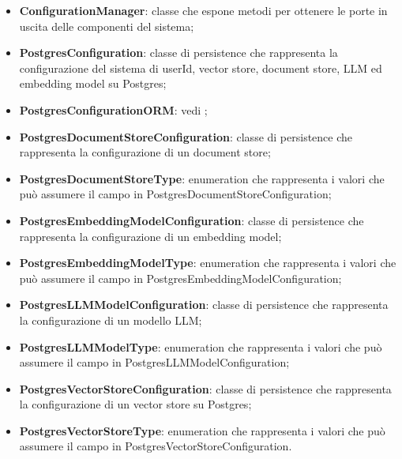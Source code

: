 \documentclass[10pt, a4paper]{article}
\begin{document}
\begin{itemize}
    \item \label{ConfigurationManager}\textbf{ConfigurationManager}: classe che espone metodi per ottenere le porte in uscita delle componenti del sistema;
    \item \label{PostgresConfiguration}\textbf{PostgresConfiguration}: classe di persistence che rappresenta la configurazione del sistema di userId, vector store, document store, LLM ed embedding model su Postgres;
    \item \textbf{PostgresConfigurationORM}: vedi ;
    \item \label{PostgresDocumentStoreConfiguration}\textbf{PostgresDocumentStoreConfiguration}: classe di persistence che rappresenta la configurazione di un document store;
    \item \label{PostgresDocumentStoreType}\textbf{PostgresDocumentStoreType}: enumeration che rappresenta i valori che può assumere il campo  in PostgresDocumentStoreConfiguration;

    \item \label{PostgresEmbeddingModelConfiguration}\textbf{PostgresEmbeddingModelConfiguration}: classe di persistence che rappresenta la configurazione di un embedding model;
    \item \label{PostgresEmbeddingModelType}\textbf{PostgresEmbeddingModelType}: enumeration che rappresenta i valori che può assumere il campo  in PostgresEmbeddingModelConfiguration;
    \item \label{PostgresLLMModelConfiguration}\textbf{PostgresLLMModelConfiguration}: classe di persistence che rappresenta la configurazione di un modello LLM;
    \item \label{PostgresLLMModelType}\textbf{PostgresLLMModelType}: enumeration che rappresenta i valori che può assumere il campo  in PostgresLLMModelConfiguration;

    \item \label{PostgresVectorStoreConfiguration}\textbf{PostgresVectorStoreConfiguration}: classe di persistence che rappresenta la configurazione di un vector store su Postgres;
    \item \label{PostgresVectorStoreType}\textbf{PostgresVectorStoreType}: enumeration che rappresenta i valori che può assumere il campo  in PostgresVectorStoreConfiguration.
   
    
\end{itemize}
 
\end{document}
